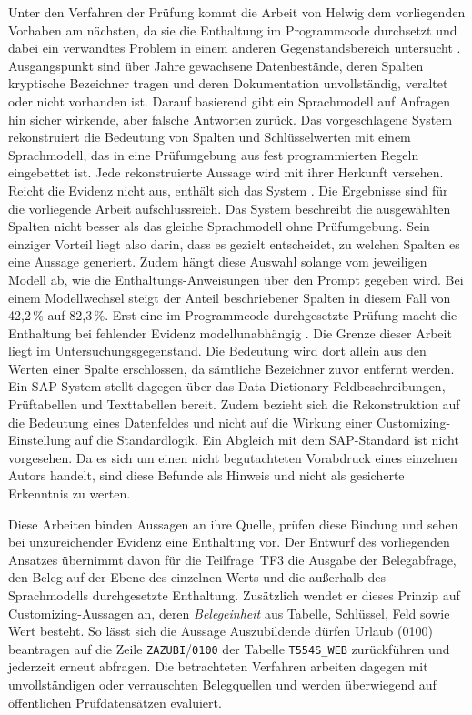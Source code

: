 Unter den Verfahren der Prüfung kommt die Arbeit von Helwig dem vorliegenden Vorhaben am nächsten, da sie die Enthaltung im Programmcode durchsetzt und dabei ein verwandtes Problem in einem anderen Gegenstandsbereich untersucht \cite{helwig_metadata_2026}. Ausgangspunkt sind über Jahre gewachsene Datenbestände, deren Spalten kryptische Bezeichner tragen und deren Dokumentation unvollständig, veraltet oder nicht vorhanden ist. Darauf basierend gibt ein Sprachmodell auf Anfragen hin sicher wirkende, aber falsche Antworten zurück. Das vorgeschlagene System rekonstruiert die Bedeutung von Spalten und Schlüsselwerten mit einem Sprachmodell, das in eine Prüfumgebung aus fest programmierten Regeln eingebettet ist. Jede rekonstruierte Aussage wird mit ihrer Herkunft versehen. Reicht die Evidenz nicht aus, enthält sich das System \cite{helwig_metadata_2026}. Die Ergebnisse sind für die vorliegende Arbeit aufschlussreich. Das System beschreibt die ausgewählten Spalten nicht besser als das gleiche Sprachmodell ohne Prüfumgebung. Sein einziger Vorteil liegt also darin, dass es gezielt entscheidet, zu welchen Spalten es eine Aussage generiert. Zudem hängt diese Auswahl solange vom jeweiligen Modell ab, wie die Enthaltungs-Anweisungen über den Prompt gegeben wird. Bei einem Modellwechsel steigt der Anteil beschriebener Spalten in diesem Fall von 42,2\,\% auf 82,3\,\%. Erst eine im Programmcode durchgesetzte Prüfung macht die Enthaltung bei fehlender Evidenz modellunabhängig \cite{helwig_metadata_2026}. Die Grenze dieser Arbeit liegt im Untersuchungsgegenstand. Die Bedeutung wird dort allein aus den Werten einer Spalte erschlossen, da sämtliche Bezeichner zuvor entfernt werden. Ein SAP-System stellt dagegen über das Data Dictionary Feldbeschreibungen, Prüftabellen und Texttabellen bereit. Zudem bezieht sich die Rekonstruktion auf die Bedeutung eines Datenfeldes und nicht auf die Wirkung einer Customizing-Einstellung auf die Standardlogik. Ein Abgleich mit dem SAP-Standard ist nicht vorgesehen. Da es sich um einen nicht begutachteten Vorabdruck eines einzelnen Autors handelt, sind diese Befunde als Hinweis und nicht als gesicherte Erkenntnis zu werten.

Diese Arbeiten binden Aussagen an ihre Quelle, prüfen diese Bindung und sehen bei unzureichender Evidenz eine Enthaltung vor. Der Entwurf des vorliegenden Ansatzes übernimmt davon für die Teilfrage~TF3 die Ausgabe der Belegabfrage, den Beleg auf der Ebene des einzelnen Werts und die außerhalb des Sprachmodells durchgesetzte Enthaltung. Zusätzlich wendet er dieses Prinzip auf Customizing-Aussagen an, deren \emph{Belegeinheit} aus Tabelle, Schlüssel, Feld sowie Wert besteht. So lässt sich die Aussage \glqq Auszubildende dürfen Urlaub (0100) beantragen\grqq{} auf die Zeile \texttt{ZAZUBI}/\texttt{0100} der Tabelle \texttt{T554S\_WEB} zurückführen und jederzeit erneut abfragen. Die betrachteten Verfahren arbeiten dagegen mit unvollständigen oder verrauschten Belegquellen und werden überwiegend auf öffentlichen Prüfdatensätzen evaluiert.


